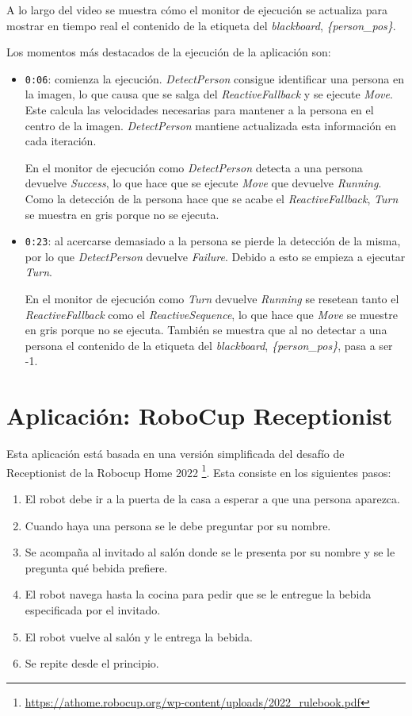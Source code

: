 \noindent A lo largo del video se muestra cómo el monitor de ejecución se actualiza para mostrar en tiempo real el contenido de la etiqueta del \textit{blackboard}, \textit{\{person\_pos\}}.

\noindent Los momentos más destacados de la ejecución de la aplicación son:

\begin{itemize}
    \item \texttt{0:06}: comienza la ejecución. \textit{DetectPerson} consigue identificar una persona en la imagen, lo que causa que se salga del \textit{ReactiveFallback} y se ejecute \textit{Move}. Este calcula las velocidades necesarias para mantener a la persona en el centro de la imagen. \textit{DetectPerson} mantiene actualizada esta información en cada iteración. 

    En el monitor de ejecución como \textit{DetectPerson} detecta a una persona devuelve \textit{Success}, lo que hace que se ejecute \textit{Move} que devuelve \textit{Running}. Como la detección de la persona hace que se acabe el \textit{ReactiveFallback}, \textit{Turn} se muestra en gris porque no se ejecuta.

    \item \texttt{0:23}: al acercarse demasiado a la persona se pierde la detección de la misma, por lo que \textit{DetectPerson} devuelve \textit{Failure}. Debido a esto se empieza a ejecutar \textit{Turn}. 

    En el monitor de ejecución como \textit{Turn} devuelve \textit{Running} se resetean tanto el \textit{ReactiveFallback} como el \textit{ReactiveSequence}, lo que hace que \textit{Move} se muestre en gris porque no se ejecuta. También se muestra que al no detectar a una persona el contenido de la etiqueta del \textit{blackboard}, \textit{\{person\_pos\}}, pasa a ser -1.
\end{itemize}

\section{Aplicación: RoboCup Receptionist}

Esta aplicación está basada en una versión simplificada del desafío de Receptionist de la Robocup Home 2022 \footnote{\url{https://athome.robocup.org/wp-content/uploads/2022_rulebook.pdf}}. Esta consiste en los siguientes pasos:
\begin{enumerate}
    \item El robot debe ir a la puerta de la casa a esperar a que una persona aparezca.
    \item Cuando haya una persona se le debe preguntar por su nombre.
    \item Se acompaña al invitado al salón donde se le presenta por su nombre y se le pregunta qué bebida prefiere.
    \item El robot navega hasta la cocina para pedir que se le entregue la bebida especificada por el invitado.
    \item El robot vuelve al salón y le entrega la bebida.
    \item Se repite desde el principio.
\end{enumerate}


